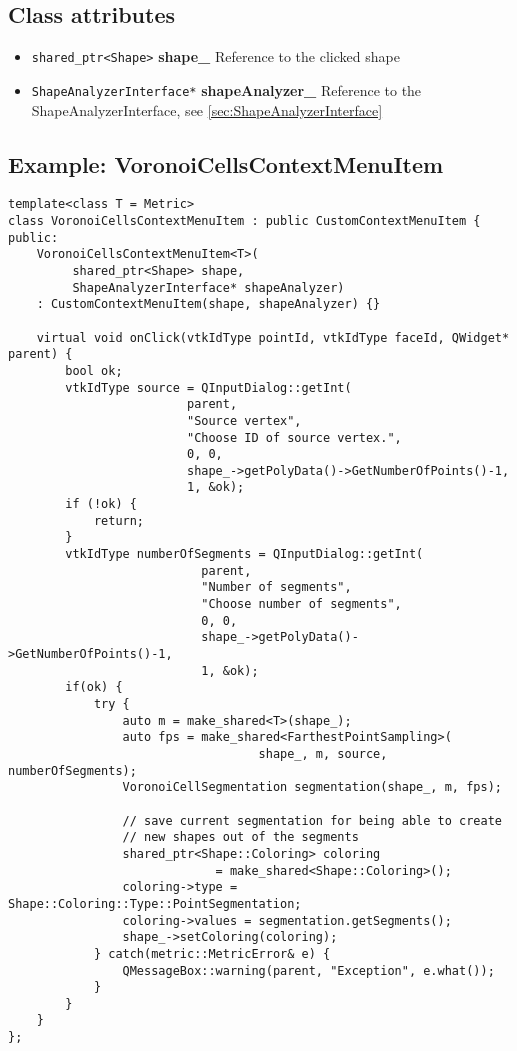\subsection{Class attributes}
\begin{itemize}
	\item \texttt{shared\_ptr<Shape>} \textbf{shape\_} Reference to the clicked shape
	\item \texttt{ShapeAnalyzerInterface*} \textbf{shapeAnalyzer\_} Reference to the ShapeAnalyzerInterface, see \ref{sec:ShapeAnalyzerInterface}
\end{itemize}

\subsection{Example: VoronoiCellsContextMenuItem}
\label{subsec:ExampleVoronoiCellsContextMenuItem}

\begin{lstlisting}[style=lstStyleCpp, caption={VoronoiCellsContextMenuItem.h}]
template<class T = Metric>
class VoronoiCellsContextMenuItem : public CustomContextMenuItem {
public:
    VoronoiCellsContextMenuItem<T>(
         shared_ptr<Shape> shape, 
         ShapeAnalyzerInterface* shapeAnalyzer) 
    : CustomContextMenuItem(shape, shapeAnalyzer) {}
    
    virtual void onClick(vtkIdType pointId, vtkIdType faceId, QWidget* parent) {
        bool ok;
        vtkIdType source = QInputDialog::getInt(
                         parent,
                         "Source vertex",
                         "Choose ID of source vertex.",
                         0, 0,
                         shape_->getPolyData()->GetNumberOfPoints()-1,
                         1, &ok);
        if (!ok) {
            return;
        }
        vtkIdType numberOfSegments = QInputDialog::getInt(
                           parent,
                           "Number of segments",
                           "Choose number of segments",
                           0, 0,
                           shape_->getPolyData()->GetNumberOfPoints()-1,
                           1, &ok);
        if(ok) {
            try {
                auto m = make_shared<T>(shape_);
                auto fps = make_shared<FarthestPointSampling>(
                                   shape_, m, source, numberOfSegments);
                VoronoiCellSegmentation segmentation(shape_, m, fps);
                
                // save current segmentation for being able to create 
                // new shapes out of the segments
                shared_ptr<Shape::Coloring> coloring 
                             = make_shared<Shape::Coloring>();
                coloring->type = Shape::Coloring::Type::PointSegmentation;
                coloring->values = segmentation.getSegments();
                shape_->setColoring(coloring);
            } catch(metric::MetricError& e) {
                QMessageBox::warning(parent, "Exception", e.what());
            }
        }
    }
};

\end{lstlisting}

